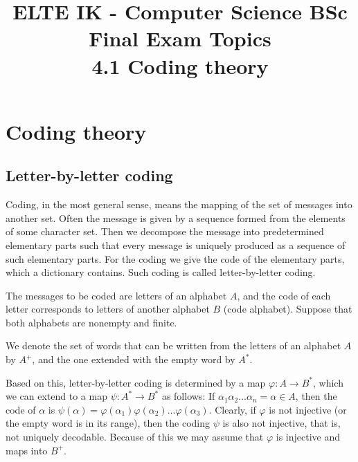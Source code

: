 \documentclass[margin=0px]{article}
\title{\textbf{{\Large ELTE IK - Computer Science BSc} \vspace{0.2cm} \\ {\huge Final Exam Topics}} \vspace{0.3cm} \\ 4.1 Coding theory}
\author{}
\date{}
\begin{document}
\maketitle

\begin{center}
\end{center}

\section{Coding theory}
\subsection{Letter-by-letter coding}
Coding, in the most general sense, means the mapping of the set of messages into another set. Often the message is given by a sequence formed from the elements of some character set. Then we decompose the message into predetermined elementary parts such that every message is uniquely produced as a sequence of such elementary parts. For the coding we give the code of the elementary parts, which a dictionary contains. Such coding is called letter-by-letter coding.

The messages to be coded are letters of an alphabet $A$, and the code of each letter corresponds to letters of another alphabet $B$ (code alphabet). Suppose that both alphabets are nonempty and finite.

We denote the set of words that can be written from the letters of an alphabet $A$ by $A^+$, and the one extended with the empty word by $A^*$.

Based on this, letter-by-letter coding is determined by a map $\varphi: A \rightarrow B^*$, which we can extend to a map $\psi: A^* \rightarrow B^*$ as follows: If $\alpha_1\alpha_2...\alpha_n = \alpha \in A$, then the code of $\alpha$ is $\psi(\alpha) = \varphi(\alpha_1)\varphi(\alpha_2)...\varphi(\alpha_3)$. Clearly, if $\varphi$ is not injective (or the empty word is in its range), then the coding $\psi$ is also not injective, that is, not uniquely decodable. Because of this we may assume that $\varphi$ is injective and maps into $B^+$.
\end{document}
